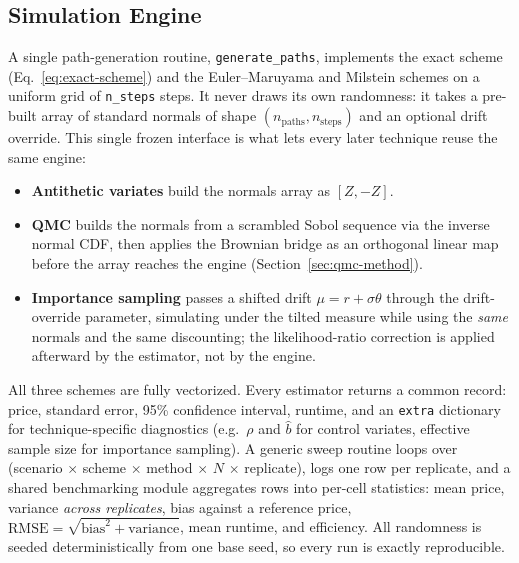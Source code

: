 \documentclass[sigconf]{acmart}
\begin{document}
\subsection{Simulation Engine}
\label{sec:engine}
A single path-generation routine, \texttt{generate\_paths}, implements the
exact scheme (Eq.~\ref{eq:exact-scheme}) and the Euler--Maruyama and Milstein
schemes on a uniform grid of \texttt{n\_steps} steps. It never draws its own
randomness: it takes a pre-built array of standard normals of shape
$(n_{\text{paths}}, n_{\text{steps}})$ and an optional drift override. This
single frozen interface is what lets every later technique reuse the same
engine:
\begin{itemize}
  \item \textbf{Antithetic variates} build the normals array as $[Z,-Z]$.
  \item \textbf{QMC} builds the normals from a scrambled Sobol sequence via
    the inverse normal CDF, then applies the Brownian bridge as an
    orthogonal linear map before the array reaches the engine
    (Section~\ref{sec:qmc-method}).
  \item \textbf{Importance sampling} passes a shifted drift
    $\mu = r+\sigma\theta$ through the drift-override parameter, simulating
    under the tilted measure while using the \emph{same} normals and the same
    discounting; the likelihood-ratio correction is applied afterward by the
    estimator, not by the engine.
\end{itemize}
All three schemes are fully vectorized. Every estimator returns a common
record: price, standard error, 95\% confidence interval, runtime, and an
\texttt{extra} dictionary for technique-specific diagnostics (e.g.\ $\rho$ and
$\hat b$ for control variates, effective sample size for importance
sampling). A generic sweep routine loops over (scenario $\times$ scheme
$\times$ method $\times$ $N$ $\times$ replicate), logs one row per replicate,
and a shared benchmarking module aggregates rows into per-cell statistics:
mean price, variance \emph{across replicates}, bias against a reference
price, $\mathrm{RMSE}=\sqrt{\text{bias}^2+\text{variance}}$, mean runtime, and
efficiency. All randomness is seeded deterministically from one base seed, so
every run is exactly reproducible.
\end{document}
